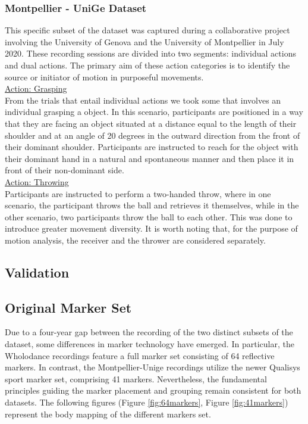 \subsubsection{Montpellier - UniGe Dataset}
This specific subset of the dataset was captured during a collaborative project involving the University of Genova and the University of Montpellier in July 2020. 
These recording sessions are divided into two segments: individual actions and dual actions. 
The primary aim of these action categories is to identify the source or initiator of motion in purposeful movements.\\
\underline{Action: Grasping}\\
From the trials that entail individual actions we took some that involves an individual grasping a object. 
In this scenario, participants are positioned in a way that they are facing an object situated at a distance equal to the length 
of their shoulder and at an angle of 20 degrees in the outward direction from the front of their dominant shoulder. 
Participants are instructed to reach for the object with their dominant hand in a natural and spontaneous manner and then place it in front of their non-dominant side.\\
\underline{Action: Throwing}\\
Participants are instructed to perform a two-handed throw, where in one scenario, 
the participant throws the ball and retrieves it themselves, while in the other scenario, two participants throw the ball to each other. 
This was done to introduce greater movement diversity.
It is worth noting that, for the purpose of motion analysis, the receiver and the thrower are considered separately.

\subsection{Validation}


\subsection{Original Marker Set}
Due to a four-year gap between the recording of the two distinct subsets of the dataset, 
some differences in marker technology have emerged. 
In particular, the Wholodance recordings feature a full marker set consisting of 64 reflective markers. 
In contrast, the Montpellier-Unige recordings utilize the newer Qualisys sport marker set, comprising 41 markers. 
Nevertheless, the fundamental principles guiding the marker placement and grouping remain consistent for both datasets. 
The following figures (Figure \ref{fig:64markers}, Figure \ref{fig:41markers}) represent the body mapping of the different markers set. 

